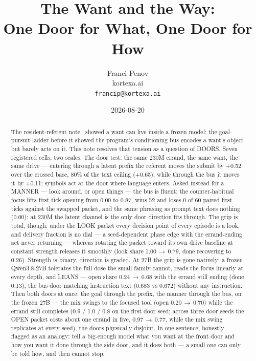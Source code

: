 \documentclass[11pt]{article}
\title{The Want and the Way:\\One Door for What, One Door for How}
\author{Franci Penov \\ kortexa.ai \\ \texttt{francip@kortexa.ai}}
\date{2026-08-20}
\begin{document}
\maketitle

\begin{abstract}
The resident-referent note~\cite{penov2026inside} showed a want can
live inside a frozen model; the goal-pursuit ladder before it showed
the program's conditioning bus encodes a want's object but barely acts
on it. This note resolves that tension as a question of DOORS. Seven
registered cells, two scales. The door test: the same 230M errand, the
same want, the same drive --- entering through a latent prefix the
referent moves the submit by +0.52 over the crossed
base, 80\% of the text ceiling
(+0.65), while through the bus it moves it by
+0.11; symbols act at the door where language enters.
Asked instead for a MANNER --- look around, or open things --- the bus
is fluent: the counter-habitual focus lifts first-tick opening from
0.00 to 0.87,
wins 52 and loses 0 of 60 paired first ticks
against the swapped packet, and the same phrasing as prompt text does
nothing (0.00); at 230M the latent
channel is the only door direction fits through. The grip is total,
though: under the LOOK packet every decision point of every episode is
a look, and delivery fraction is no dial --- a seed-dependent phase
edge with the errand-ending act never returning --- whereas rotating
the packet toward its own drive baseline at constant strength releases
it smoothly (look share 1.00\,$\to$\,0.79,
done recovering to 0.26). Strength is binary,
direction is graded. At 27B the grip is gone natively: a frozen
Qwen3.8-27B tolerates the full dose the small family cannot, reads the
focus linearly at every depth, and LEANS --- open share
0.24\,$\to$\,0.68
with the errand still ending (done 0.13), the bus door
matching instruction text (0.683 vs
0.672) without any instruction. Then
both doors at once: the goal through the prefix, the manner through
the bus, on the frozen 27B --- the mix swings to the focused tool
(open 0.20\,$\to$\,0.70)
while the errand still completes (0.9 /
1.0 / 0.8 on the
first door seed; across three door seeds the OPEN packet costs about
one errand in five, 0.97\,$\to$\,0.77, while
the mix swing replicates at every seed), the doors physically disjoint. In one
sentence, honestly flagged as an analogy: tell a big-enough model what
you want at the front door and how you want it done through the side
door, and it does both --- a small one can only be told how, and then
cannot stop.
\end{abstract}
\end{document}
